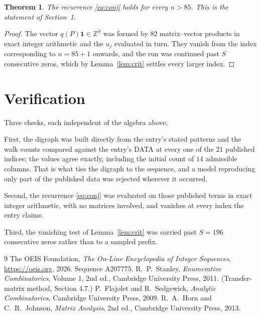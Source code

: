 \documentclass[11pt,a4paper]{article}
\theoremstyle{plain}
\newtheorem{theorem}{Theorem}
\theoremstyle{definition}
\begin{document}
\begin{theorem}
The recurrence \eqref{eq:conj} holds for every $n>85$. This is the statement of
Section~1.
\end{theorem}

\begin{proof}
The vector $q(P)\mathbf{1}\in\mathbb{Z}^{S}$ was formed by $82$ matrix--vector
products in exact integer arithmetic and the $u_j$ evaluated in turn. They vanish from the
index corresponding to $n=85+1$ onwards, and the run was continued past $S$ consecutive
zeros, which by Lemma~\ref{lem:crit} settles every larger index.
\end{proof}

\section{Verification}

Three checks, each independent of the algebra above.

First, the digraph was built directly from the entry's stated patterns and the walk counts
compared against the entry's DATA at every one of the $21$ published indices; the
values agree exactly, including the initial count of $14$ admissible columns. That is
what ties the digraph to the sequence, and a model reproducing only part of the published
data was rejected wherever it occurred.

Second, the recurrence \eqref{eq:conj} was evaluated on those published terms in exact
integer arithmetic, with no matrices involved, and vanishes at every index the entry claims.

Third, the vanishing test of Lemma~\ref{lem:crit} was carried past $S=196$ consecutive
zeros rather than to a sampled prefix.

\begin{thebibliography}{9}
 The OEIS Foundation, \emph{The On-Line Encyclopedia of Integer
Sequences}, \url{https://oeis.org}, 2026. Sequence A207775.
 R.~P.~Stanley, \emph{Enumerative Combinatorics}, Volume 1, 2nd ed.,
Cambridge University Press, 2011. (Transfer-matrix method, Section 4.7.)
 P.~Flajolet and R.~Sedgewick, \emph{Analytic Combinatorics}, Cambridge
University Press, 2009.
 R.~A.~Horn and C.~R.~Johnson, \emph{Matrix Analysis}, 2nd ed., Cambridge
University Press, 2013.
\end{thebibliography}
\end{document}
